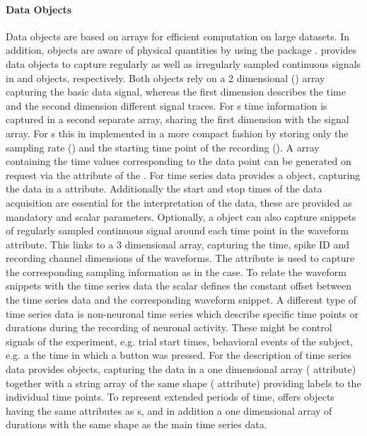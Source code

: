 \paragraph{Data Objects}
Data objects are based on  arrays \citep{Walt_2011} for efficient computation on large datasets. In addition,  objects are aware of physical quantities by using the  package \citep{Dale_}.
 provides data objects to capture regularly as well as irregularly sampled continuous signals in  and  objects, respectively. Both objects rely on a 2 dimensional  () array capturing the basic data signal, whereas the first dimension describes the time and the second dimension different signal traces. For s time information is captured in a second separate  array, sharing the first dimension with the signal array. For s this in implemented in a more compact fashion by storing only the sampling rate () and the starting time point of the recording (). A  array containing the time values corresponding to the data point can be generated on request via the  attribute of the .
For time series data  provides a  object, capturing the data in a  attribute. Additionally the start and stop times of the data acquisition are essential for the interpretation of the data, these are provided as mandatory  and  scalar  parameters. Optionally, a  object can also capture snippets of regularly sampled continuous signal around each time point in the waveform attribute. This links to a 3 dimensional array, capturing the time, spike ID and recording channel dimensions of the waveforms. The  attribute  is used to capture the corresponding sampling information as in the  case. To relate the waveform snippets with the time series data the  scalar  defines the constant offset between the time series data and the corresponding waveform snippet.
A different type of time series data is non-neuronal time series which describe specific time points or durations during the recording of neuronal activity. These might be control signals of the experiment, e.g. trial start times, behavioral events of the subject, e.g. a the time in which a button was pressed. For the description of time series data  provides  objects, capturing the data in a one dimensional  array ( attribute) together with a string array of the same shape ( attribute) providing labels to the individual time points. To represent extended periods of time,  offers  objects having the same attributes as s, and in addition a one dimensional  array of durations with the same shape as the main time series data.

